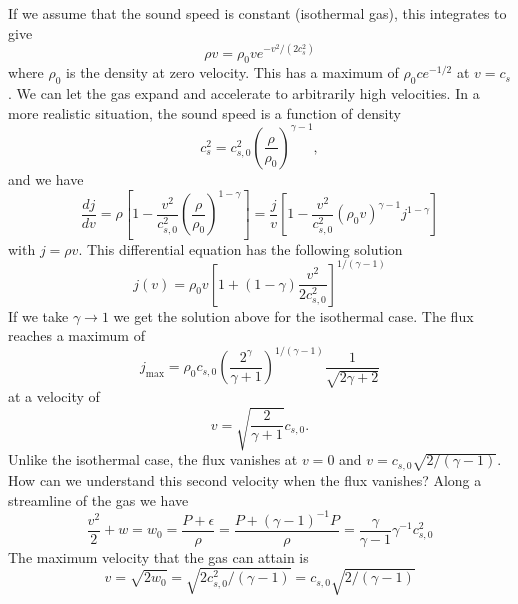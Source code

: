 \documentclass{article}
\newcommand{\dd}[2]{\frac{d {#1}}{d {#2}}}
\begin{document}
\begin{enumerate}
If we assume that the sound speed is constant (isothermal gas), 
this integrates to give
\begin{equation}
\rho v = \rho_0 v e^{-v^2/(2c_s^2)}
\end{equation}
where $\rho_0$ is the density at zero velocity.  This has a maximum of
$\rho_0 c e^{-1/2}$ at
$v=c_s$.  We can let the gas expand and accelerate to arbitrarily high
velocities.   In a more realistic situation, the sound speed is a
function of density
\begin{equation}
c_s^2 = c_{s,0}^2 \left ( \frac{\rho}{\rho_0} \right )^{\gamma-1},
\end{equation}
and we have 
\begin{equation}
\dd{j}{v} = \rho \left [ 1  -
\frac{v^2}{c_{s,0}^2} \left ( \frac{\rho}{\rho_0} \right )^{1-\gamma} \right ]
 = \frac{j}{v} \left [ 1  -
\frac{v^2}{c_{s,0}^2} (\rho_0 v)^{\gamma-1} j^{1-\gamma} \right ]
\end{equation}
with $j=\rho v$.  This differential equation has the following
solution
\begin{equation}
j(v) = \rho_0 v \left [ 1 + \left ( 1 - \gamma \right )
  \frac{v^2}{2 c_{s,0}^2} \right ]^{1/(\gamma-1)}
\end{equation}
If we take $\gamma\rightarrow 1$ we get the solution above for the
isothermal case.  The flux reaches a maximum of
\begin{equation}
j_\mathrm{max} = \rho_0 c_{s,0} \left ( \frac{2^\gamma}{\gamma+1}
\right )^{1/(\gamma-1)} \frac{1}{\sqrt{2\gamma+2}}
\end{equation}
at a velocity of
\begin{equation}
  v = \sqrt{\frac{2}{\gamma+1}} c_{s,0}.
\end{equation}
Unlike the isothermal case, the flux vanishes at
$v=0$ and $v=c_{s,0}\sqrt{2/(\gamma-1)}$.  How can we understand this
second velocity when the flux vanishes?   Along a streamline of the
gas we have
\begin{equation}
\frac{v^2}{2} + w = w_0 = \frac{P + \epsilon}{\rho} = \frac{P +
  (\gamma-1)^{-1} P}{\rho} = \frac{\gamma}{\gamma-1} \gamma^{-1} c_{s,0}^2
\end{equation}
The maximum velocity that the gas can attain is
\begin{equation}
v = \sqrt{2 w_0} = \sqrt{2 c_{s,0}^2/(\gamma-1)} = c_{s,0} \sqrt{2/(\gamma-1)}
\end{equation}

\end{enumerate}
\end{document}

